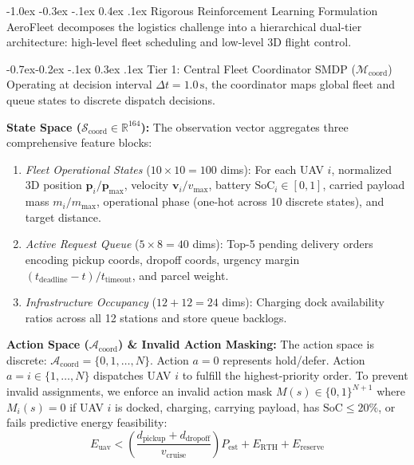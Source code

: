 \documentclass[10pt,twocolumn,letterpaper]{article}
\makeatletter
\renewcommand{\section}{\@startsection{section}{1}{\z@}%
  {-1.0ex \@plus -0.3ex \@minus -.1ex}%
  {0.4ex \@plus .1ex}%
  {\normalfont\bfseries\normalsize}}
\renewcommand{\subsection}{\@startsection{subsection}{2}{\z@}%
  {-0.7ex\@plus -0.2ex \@minus -.1ex}%
  {0.3ex \@plus .1ex}%
  {\normalfont\bfseries\small}}
\makeatother
\begin{document}
\section{Rigorous Reinforcement Learning Formulation}
AeroFleet decomposes the logistics challenge into a hierarchical dual-tier architecture: high-level fleet scheduling and low-level 3D flight control.

\subsection{Tier 1: Central Fleet Coordinator SMDP (\texorpdfstring{$\mathcal{M}_{\text{coord}}$}{M\_coord})}
Operating at decision interval $\Delta t = 1.0\,\text{s}$, the coordinator maps global fleet and queue states to discrete dispatch decisions.

\textbf{State Space ($\mathcal{S}_{\text{coord}} \in \mathbb{R}^{164}$):} The observation vector aggregates three comprehensive feature blocks:
\begin{enumerate}
    \item \emph{Fleet Operational States} ($10 \times 10 = 100$ dims): For each UAV $i$, normalized 3D position $\mathbf{p}_i / \mathbf{p}_{\max}$, velocity $\mathbf{v}_i / v_{\max}$, battery $\text{SoC}_i \in [0, 1]$, carried payload mass $m_i / m_{\max}$, operational phase (one-hot across 10 discrete states), and target distance.
    \item \emph{Active Request Queue} ($5 \times 8 = 40$ dims): Top-5 pending delivery orders encoding pickup coords, dropoff coords, urgency margin $(t_{\text{deadline}} - t)/t_{\text{timeout}}$, and parcel weight.
    \item \emph{Infrastructure Occupancy} ($12 + 12 = 24$ dims): Charging dock availability ratios across all 12 stations and store queue backlogs.
\end{enumerate}

\textbf{Action Space ($\mathcal{A}_{\text{coord}}$) \& Invalid Action Masking:}
The action space is discrete: $\mathcal{A}_{\text{coord}} = \{0, 1, \dots, N\}$. Action $a=0$ represents hold/defer. Action $a=i \in \{1,\dots,N\}$ dispatches UAV $i$ to fulfill the highest-priority order. To prevent invalid assignments, we enforce an invalid action mask $M(s) \in \{0, 1\}^{N+1}$ where $M_i(s) = 0$ if UAV $i$ is docked, charging, carrying payload, has $\text{SoC} \le 20\%$, or fails predictive energy feasibility:
\begin{equation}
    E_{\text{uav}} < \left(\frac{d_{\text{pickup}} + d_{\text{dropoff}}}{v_{\text{cruise}}}\right) P_{\text{est}} + E_{\text{RTH}} + E_{\text{reserve}}
\end{equation}
\end{document}
